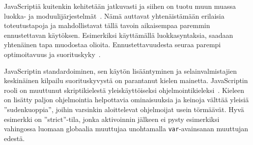 JavaScriptiä kuitenkin kehitetään jatkuvasti ja siihen on tuotu muun muassa luokka- ja moduulijärjestelmät~\cite[luvut 14.5.~ja~15.2.]{es6}. Nämä auttavat yhtenäistämään erilaisia toteutustapoja ja mahdollistavat tällä tavoin aikaisempaa paremmin ennustettavan käytöksen. Esimerkiksi käyttämällä luokkasyntaksia, saadaan yhtenäinen tapa muodostaa olioita. Ennustettavuudesta seuraa parempi optimoitavuus ja suorituskyky~\cite[s.~497]{Ahn2014}.

JavaScriptin standardoiminen, sen käytön lisääntyminen ja selainvalmistajien keskinäinen kilpailu suorituskyvystä on parantanut kielen mainetta. JavaScriptin rooli on muuttunut skriptikielestä yleiskäyttöiseksi ohjelmointikieleksi~\cite[luku 4.]{es6}. Kieleen on lisätty paljon ohjelmointia helpottavia ominaisuuksia ja keinoja välttää yleisiä ''sudenkuoppia'', joihin varsinkin aloittelevat ohjelmoijat usein törmäävät. Hyvä esimerkki on ''strict''-tila, jonka aktivoinnin jälkeen ei pysty esimerkiksi vahingossa luomaan globaalia muuttujaa unohtamalla \texttt{var}-avainsanan muuttujan edestä.